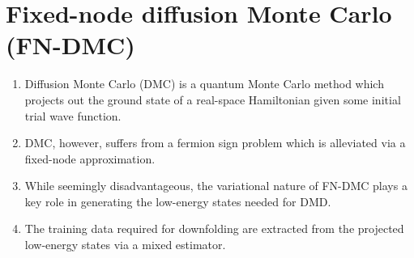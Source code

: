 \documentclass{article}
\begin{document}
\section{Fixed-node diffusion Monte Carlo (FN-DMC)}
\begin{enumerate}
\item Diffusion Monte Carlo (DMC) is a quantum Monte Carlo method which projects out the ground state of a real-space Hamiltonian given some initial trial wave function.

\item DMC, however, suffers from a fermion sign problem which is alleviated via a fixed-node approximation.

\item While seemingly disadvantageous, the variational nature of FN-DMC plays a key role in generating the low-energy states needed for DMD.  

\item The training data required for downfolding are extracted from the projected low-energy states via a mixed estimator.
\end{enumerate}
\end{document}

